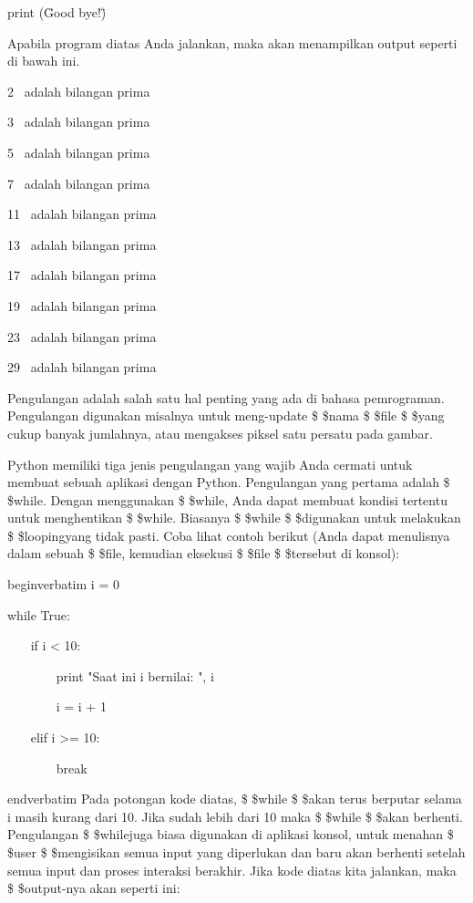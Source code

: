 \vspace{12pt}
print (\"Good bye!\") \par
\vspace{12pt}
\vspace{\baselineskip}
Apabila program diatas Anda jalankan, maka akan menampilkan output seperti di bawah ini.\vspace{\baselineskip}
\vspace{\baselineskip}
 \par
2~ adalah bilangan prima \par
3~ adalah bilangan prima \par
5~ adalah bilangan prima \par
7~ adalah bilangan prima \par
11~ adalah bilangan prima \par
13~ adalah bilangan prima \par
17~ adalah bilangan prima \par
19~ adalah bilangan prima \par
23~ adalah bilangan prima \par
29~ adalah bilangan prima \par
\vspace{12pt}
Pengulangan adalah salah satu hal penting yang ada di bahasa pemrograman. Pengulangan digunakan misalnya untuk meng-update \$  \$nama \$  \$file \$  \$yang cukup banyak jumlahnya, atau mengakses piksel satu persatu pada gambar. \par
Python memiliki tiga jenis pengulangan yang wajib Anda cermati untuk membuat sebuah aplikasi dengan Python. Pengulangan yang pertama adalah \$  \$while. Dengan menggunakan \$  \$while, Anda dapat membuat kondisi tertentu untuk menghentikan \$  \$while. Biasanya \$  \$while \$  \$digunakan untuk melakukan \$  \$loopingyang tidak pasti. Coba lihat contoh berikut (Anda dapat menulisnya dalam sebuah \$  \$file, kemudian eksekusi \$  \$file \$  \$tersebut di konsol): \par
begin{verbatim}
i = 0 \par
while True: \par
~~~ if i < 10: \par
~~~~~~~ print "Saat ini i bernilai: ", i \par
~~~~~~~ i = i + 1 \par
~~~ elif i >= 10: \par
~~~~~~~ break \par
end{verbatim}
\vspace{12pt}
Pada potongan kode diatas, \$  \$while \$  \$akan terus berputar selama i masih kurang dari 10. Jika sudah lebih dari 10 maka \$  \$while \$  \$akan berhenti. Pengulangan \$  \$whilejuga biasa digunakan di aplikasi konsol, untuk menahan \$  \$user \$  \$mengisikan semua input yang diperlukan dan baru akan berhenti setelah semua input dan proses interaksi berakhir. Jika kode diatas kita jalankan, maka \$  \$output-nya akan seperti ini: \par
